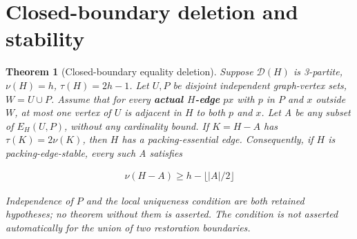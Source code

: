 \documentclass[11pt]{article}
\newtheorem{theorem}{Theorem}[section]
\theoremstyle{definition}\newtheorem{definition}[theorem]{Definition}
\theoremstyle{remark}\newtheorem{remark}[theorem]{Remark}
\begin{document}
\section{Closed-boundary deletion and stability}\label{sec:boundary}
\begin{theorem}[Closed-boundary equality deletion]\label{thm:boundary}
Suppose \(\mathcal D(H)\) is 3-partite, \(\nu(H)=h\), \(\tau(H)=2h-1\). Let \(U,P\) be disjoint independent graph-vertex sets, \(W=U \cup P\). Assume that for every \textbf{actual \(H\)-edge} \(px\) with \(p\) in \(P\) and \(x\) outside \(W\), at most one vertex of \(U\) is adjacent in \(H\) to both \(p\) and \(x\). Let A be any subset of \(E_H(U,P)\), without any cardinality bound. If \(K=H-A\) has \(\tau(K)=2\nu(K)\), then \(H\) has a packing-essential edge. Consequently, if \(H\) is packing-edge-stable, every such A satisfies

\begin{equation}
\begin{gathered}
\nu(H-A) \ge  h-\lfloor |A|/2\rfloor
\end{gathered}
\end{equation}

Independence of \(P\) and the local uniqueness condition are both retained hypotheses; no theorem without them is asserted. The condition is not asserted automatically for the union of two restoration boundaries.
\end{theorem}
\end{document}
